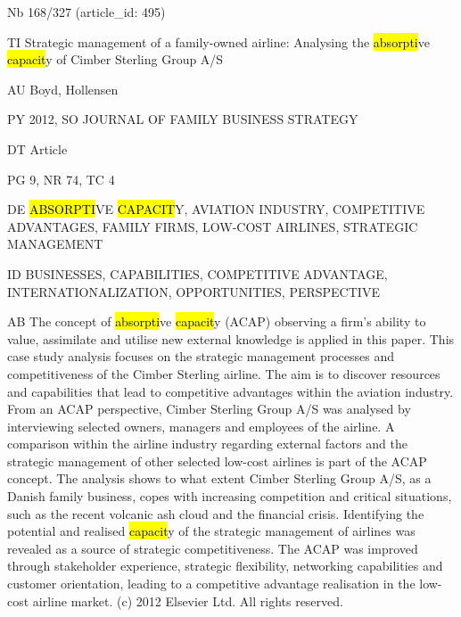 \documentclass[a4paper]{article}
\begin{document}
\vspace*{-2cm}
Nb \tabto{0cm}168/327 (article\_id: 495)\par
TI \tabto{0cm}Strategic management of a family-owned airline: Analysing the \hl{absorpti}ve \hl{capacit}y of Cimber Sterling Group A/S\par
AU \tabto{0cm}Boyd, Hollensen\par
PY \tabto{0cm}2012, SO JOURNAL OF FAMILY BUSINESS STRATEGY\par
DT \tabto{0cm}Article\par
PG \tabto{0cm}9, NR 74, TC 4\par
DE \tabto{0cm}\hl{ABSORPTI}VE \hl{CAPACIT}Y, AVIATION INDUSTRY, COMPETITIVE ADVANTAGES, FAMILY FIRMS, LOW-COST AIRLINES, STRATEGIC MANAGEMENT\par
ID \tabto{0cm}BUSINESSES, CAPABILITIES, COMPETITIVE ADVANTAGE, INTERNATIONALIZATION, OPPORTUNITIES, PERSPECTIVE\par
AB \tabto{0cm}The concept of \hl{absorpti}ve \hl{capacit}y (ACAP) observing a firm's ability to value, assimilate and utilise new external knowledge is applied in this paper. This case study analysis focuses on the strategic management processes and competitiveness of the Cimber Sterling airline. The aim is to discover resources and capabilities that lead to competitive advantages within the aviation industry. From an ACAP perspective, Cimber Sterling Group A/S was analysed by interviewing selected owners, managers and employees of the airline. A comparison within the airline industry regarding external factors and the strategic management of other selected low-cost airlines is part of the ACAP concept. The analysis shows to what extent Cimber Sterling Group A/S, as a Danish family business, copes with increasing competition and critical situations, such as the recent volcanic ash cloud and the financial crisis. Identifying the potential and realised \hl{capacit}y of the strategic management of airlines was revealed as a source of strategic competitiveness. The ACAP was improved through stakeholder experience, strategic flexibility, networking capabilities and customer orientation, leading to a competitive advantage realisation in the low-cost airline market. (c) 2012 Elsevier Ltd. All rights reserved.\par
\clearpage
\end{document}
